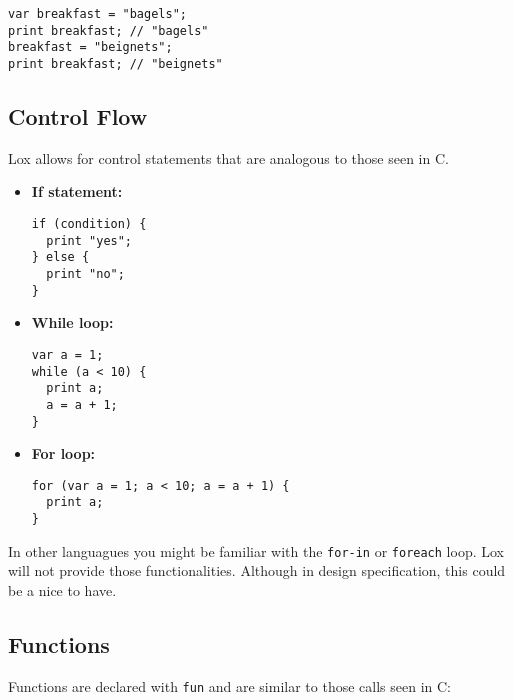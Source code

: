 \documentclass[12pt,a4paper]{article}
\begin{document}
\begin{lstlisting}
var breakfast = "bagels";
print breakfast; // "bagels"
breakfast = "beignets";
print breakfast; // "beignets"
\end{lstlisting}

\subsection{Control Flow}
Lox allows for control statements that are analogous to those seen in C.

\begin{itemize}

	\item	\textbf{If statement:}
	      \begin{lstlisting}
if (condition) {
  print "yes";
} else {
  print "no";
}
\end{lstlisting}

	\item    \textbf{While loop:}
	      \begin{lstlisting}
var a = 1;
while (a < 10) {
  print a;
  a = a + 1;
}
\end{lstlisting}

	\item\textbf{For loop:}
	      \begin{lstlisting}
for (var a = 1; a < 10; a = a + 1) {
  print a;
}
\end{lstlisting}
\end{itemize}

In other languagues you might be familiar with the \texttt{for-in} or \texttt{foreach} loop.
Lox will not provide those functionalities. Although in design specification, this could be a nice to have.

\subsection{Functions}

Functions are declared with \texttt{fun} and are similar to those calls seen in C:
\end{document}
